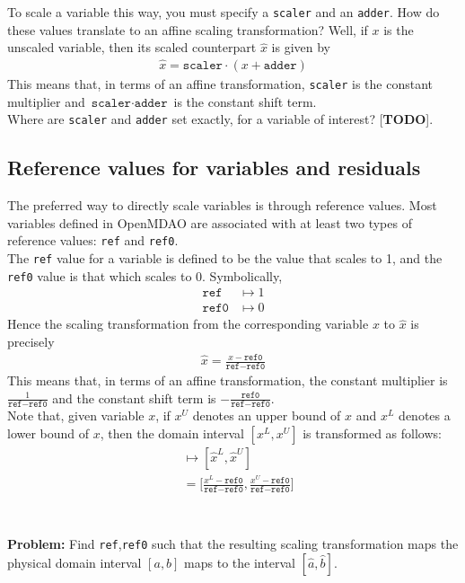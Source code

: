 \documentclass{article}
\begin{document}
To scale a variable this way, you must specify a \texttt{scaler} and an \texttt{adder}. How do these values translate to an affine scaling transformation? Well, if $x$ is the unscaled variable, then its scaled counterpart $\hat{x}$ is given by
\begin{align}
    \hat{x} = \texttt{scaler} \cdot (x + \texttt{adder}) \label{eq:scaler_adder_trans}
\end{align}
This means that, in terms of an affine transformation, \texttt{scaler} is the constant multiplier and $\texttt{scaler} \cdot \texttt{adder}$ is the constant shift term. \\

\noindent
Where are \texttt{scaler} and \texttt{adder} set exactly, for a variable of interest? [\textbf{TODO}].

\subsection*{Reference values for variables and residuals}

The preferred way to directly scale variables is through reference values. Most variables defined in OpenMDAO are associated with at least two types of reference values: \texttt{ref} and \texttt{ref0}. \\

\noindent
The \texttt{ref} value for a variable is defined to be the value that scales to 1, and the \texttt{ref0} value is that which scales to 0. Symbolically,
\begin{align*}
    \texttt{ref} &\mapsto 1 \\
    \texttt{ref0} &\mapsto 0
\end{align*}
Hence the scaling transformation from the corresponding variable $x$ to $\hat{x}$ is precisely
\begin{align}
    \hat{x} = \frac{x - \texttt{ref0}}{\texttt{ref} - \texttt{ref0}} \label{eq:ref_scale}
\end{align}
This means that, in terms of an affine transformation, the constant multiplier is $\frac{1}{\texttt{ref} - \texttt{ref0}}$ and the constant shift term is $-\frac{\texttt{ref0}}{\texttt{ref} - \texttt{ref0}}$. \\

\noindent
Note that, given variable $x$, if $x^U$ denotes an upper bound of $x$ and $x^L$ denotes a lower bound of $x$, then the domain interval $[x^L,x^U]$ is transformed as follows:
\begin{align*}
    [x^L,x^U] &\mapsto [\hat{x}^L,\hat{x}^U] \\
    &= \Big[\frac{x^L-\texttt{ref0}}{\texttt{ref}-\texttt{ref0}},\frac{x^U-\texttt{ref0}}{\texttt{ref}-\texttt{ref0}}\Big] \\
\end{align*}
\\ \\
\noindent
\textbf{Problem:} Find \texttt{ref},\texttt{ref0} such that the resulting scaling transformation maps the physical domain interval $[a,b]$ maps to the interval $[\hat{a},\hat{b}]$. \\
\end{document}
